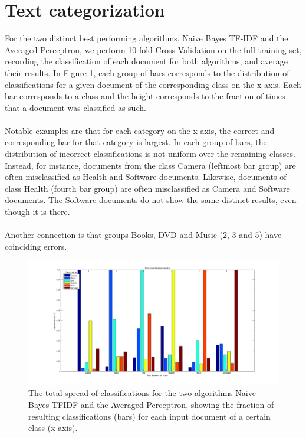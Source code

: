 \section{Text categorization}
For the two distinct best performing algorithms, Naive Bayes TF-IDF and the Averaged Perceptron, we perform 10-fold Cross Validation on the full training set, recording the classification of each document for both algorithms, and average their results. In Figure \ref{fig:textcategorization}, each group of bars corresponds to the distribution of classifications for a given document of the corresponding class on the x-axis. Each bar corresponds to a class and the height corresponds to the fraction of times that a document was classified as such.
\\\\
Notable examples are that for each category on the x-axis, the correct and corresponding bar for that category is largest. In each group of bars, the distribution of incorrect classifications is not uniform over the remaining classes. Instead, for instance, documents from the class Camera (leftmost bar group) are often misclassified as Health and Software documents. Likewise, documents of class Health (fourth bar group) are often misclassified as Camera and Software documents. The Software documents do not show the same distinct results, even though it is there.
\\\\
Another connection is that groups Books, DVD and Music (2, 3 and 5) have coinciding errors.

\begin{figure}[h!]
	\centering
	\includegraphics[width=1\linewidth]{../Plottar/text_categorization.png}
	\caption{The total spread of classifications for the two algorithms Naive Bayes TFIDF and the Averaged Perceptron, showing the fraction of resulting classifications (bars) for each input document of a certain class (x-axis).}
	\label{fig:textcategorization}
\end{figure}  




